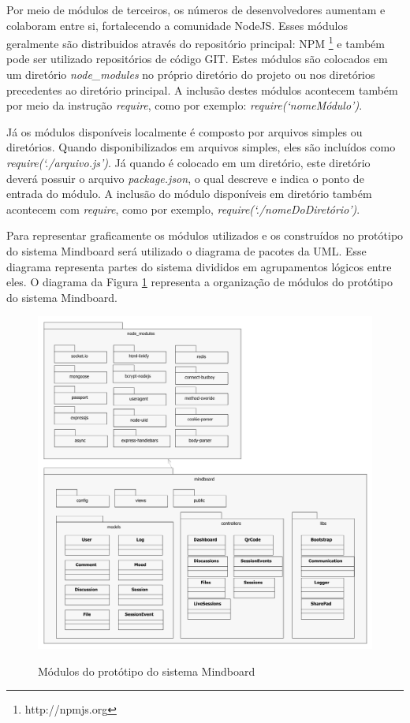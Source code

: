 Por meio de módulos de terceiros, os números de desenvolvedores aumentam e colaboram entre si, fortalecendo a comunidade NodeJS. Esses módulos geralmente são distribuidos através do repositório principal: NPM \footnote{http://npmjs.org} e também pode ser utilizado repositórios de código GIT. Estes módulos são colocados em um diretório \emph{node\_modules} no próprio diretório do projeto ou nos diretórios precedentes ao diretório principal. A inclusão destes módulos acontecem também por meio da instrução \emph{require}, como por exemplo: \emph{require(`nomeMódulo')}.

Já os módulos disponíveis localmente é composto por arquivos simples ou diretórios. Quando disponibilizados em arquivos simples, eles são incluídos como \emph{require(`./arquivo.js')}. Já quando é colocado em um diretório, este diretório deverá possuir o arquivo \emph{package.json}, o qual descreve e indica o ponto de entrada do módulo. A inclusão do módulo disponíveis em diretório também acontecem com \emph{require}, como por exemplo, \emph{require(`./nomeDoDiretório')}.

Para representar graficamente os módulos utilizados e os construídos no protótipo do sistema Mindboard será utilizado o diagrama de pacotes da UML. Esse diagrama representa partes do sistema divididos em agrupamentos lógicos entre eles. O diagrama da Figura \ref{fig:modulos} representa a organização de módulos do protótipo do sistema Mindboard.


\begin{figure}[h]
\centering
\caption{Módulos do protótipo do sistema Mindboard}
\includegraphics[width=1.0\textwidth]{pdfs/modulos.pdf} 
\label{fig:modulos} 
\end{figure}

